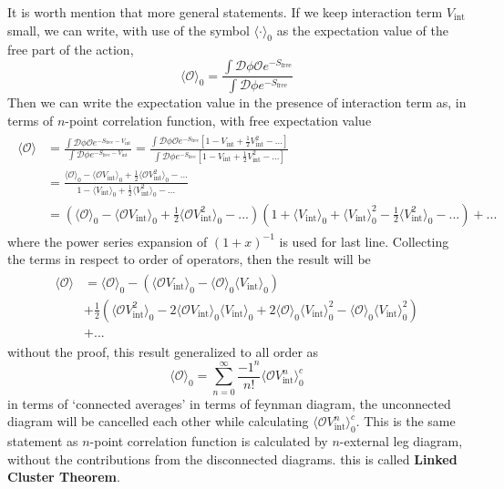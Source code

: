 \documentclass[12pt,halfline,a4paper]{ouparticle}
\begin{document}
It is worth mention that more general statements. If we keep interaction term $V_\text{int}$ small, we can write, with use of the symbol $\langle\cdot\rangle_0$ as the expectation value of the free part of the action,
\begin{equation}
	\langle\mathcal O \rangle_0 = \frac{\int \mathcal D \phi\mathcal O e^{-S_\text{free}}}{\int \mathcal D \phi e^{-S_\text{free}}}
\end{equation}
Then we can write the expectation value in the presence of interaction term as, in terms of $n$-point correlation function, with free expectation value
\begin{align}\begin{split}
	\label{eq:perturbative}
	\langle \mathcal O \rangle &= \frac{\int \mathcal D \phi \mathcal O e^{-S_\text{free}-V_\text{int}}}{\int \mathcal D \phi e^{-S_\text{free}-V_\text{int}}}=\frac{\int \mathcal D \phi \mathcal O e^{-S_\text{free}}[1-V_\text{int}+\frac{1}{2}V_\text{int}^2-...]}{\int \mathcal D \phi e^{-S_\text{free}}[1-V_\text{int}+\frac{1}{2}V_\text{int}^2-...]}\\
	&=\frac{\langle \mathcal O \rangle_0 -\langle \mathcal O V_\text{int} \rangle_0 +\frac{1}{2}\langle \mathcal O V_\text{int}^2 \rangle_0-...}{1 -\langle V_\text{int} \rangle_0 +\frac{1}{2}\langle V_\text{int}^2 \rangle_0-...}\\
	&=(\langle \mathcal O \rangle_0 -\langle \mathcal O V_\text{int} \rangle_0 +\frac{1}{2}\langle \mathcal O V_\text{int}^2 \rangle_0-...)(1+\langle V_\text{int} \rangle_0+\langle V_\text{int} \rangle_0^2 -\frac{1}{2}\langle V_\text{int}^2 \rangle_0-...)+...
\end{split}\end{align}
where the power series expansion of $(1+x)^{-1}$ is used for last line. Collecting the terms in respect to order of operators, then the result will be
\begin{align}
	\begin{split}
\langle\mathcal O \rangle &= \langle \mathcal O \rangle_0 - (\langle\mathcal O V_\text{int}\rangle_0-\langle\mathcal O\rangle_0\langle V_\text{int}\rangle_0)\\
&+\frac{1}{2}(\langle \mathcal O V_\text{int}^2 \rangle_0-2\langle \mathcal O V_\text{int} \rangle_0\langle V_\text{int} \rangle_0+2\langle \mathcal O \rangle_0\langle V_\text{int} \rangle_0^2-\langle \mathcal O \rangle_0\langle V_\text{int} \rangle_0^2)\\
&+...
	\end{split}
\end{align}
without the proof, this result generalized to all order as 
\begin{equation}
	\langle\mathcal O\rangle_0 = \sum^\infty_{n=0}\frac{-1^n}{n!}\langle \mathcal O V_\text{int}^n\rangle_0^c
\end{equation}
in terms of `connected averages'
  in terms of feynman diagram, the unconnected diagram will be cancelled each other while calculating $\langle\mathcal O V_\text{int}^n\rangle_0^c$. This is the same statement as $n$-point correlation function is calculated by $n$-external leg diagram, without the contributions from the disconnected diagrams. this is called \textbf{Linked Cluster Theorem}.
\end{document}
